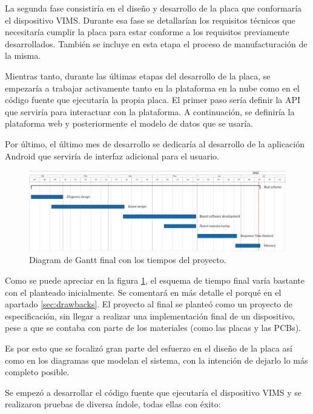 La segunda fase consistiría en el diseño y desarrollo de la placa que conformaría
el dispositivo \ac{VIMS}. Durante esa fase se detallarían los requisitos técnicos
que necesitaría cumplir la placa para estar conforme a los requisitos previamente
desarrollados. También se incluye en esta etapa el proceso de manufacturación
de la misma.

Mientras tanto, durante las últimas etapas del desarrollo de la placa, se empezaría
a trabajar activamente tanto en la plataforma en la nube como en el código fuente que
ejecutaría la propia placa. El primer paso sería definir la \ac{API} que serviría para
interactuar con la plataforma. A continuación, se definiría la plataforma web y posteriormente
el modelo de datos que se usaría.

Por último, el último mes de desarrollo se dedicaría al desarrollo de la aplicación
Android que serviría de interfaz adicional para el usuario.

\begin{figure}[H]
  \centering
  \includegraphics[width=\linewidth]{images/gantt-chart-real.png}
  \caption{Diagram de Gantt final con los tiempos del proyecto.}
  \label{fig:gantt-real}
\end{figure}

Como se puede apreciar en la figura \ref{fig:gantt-real}, el esquema de tiempo final
varía bastante con el planteado inicialmente. Se comentará en más detalle el porqué
en el apartado \ref{sec:drawbacks}. El proyecto al final se planteó como un proyecto
de especificación, sin llegar a realizar una implementación final de un dispositivo,
pese a que se contaba con parte de los materiales (como las placas y las PCBs).

Es por esto que se focalizó gran parte del esfuerzo en el diseño de la placa así como
en los diagramas que modelan el sistema, con la intención de dejarlo lo más
completo posible.

Se empezó a desarrollar el código fuente que ejecutaría el dispositivo \ac{VIMS}
y se realizaron pruebas de diversa índole, todas ellas con éxito:

